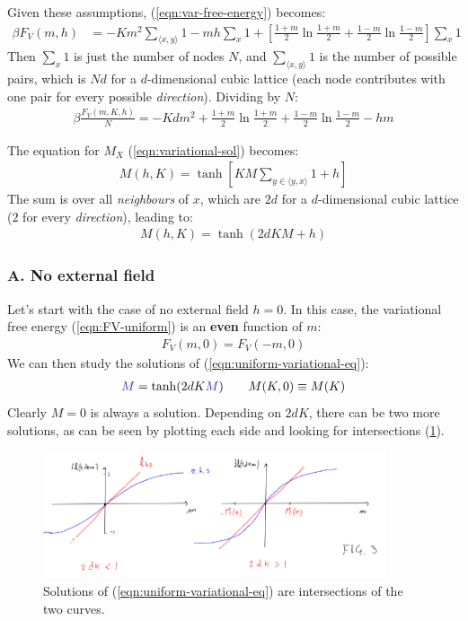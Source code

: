 \documentclass[../../main.tex]{subfiles}
\begin{document}
\medskip

Given these assumptions, (\ref{eqn:var-free-energy}) becomes:
\begin{align*}
    \beta F_V(m, h) &= -K m^2 \sum_{\langle x,y \rangle} 1 - mh\sum_x1 + \left[\frac{1+m}{2} \ln \frac{1+m}{2} + \frac{1-m}{2} \ln \frac{1-m}{2} \right] \sum_x 1 
\end{align*}
Then $\sum_x 1$ is just the number of nodes $N$, and $\sum_{\langle x,y \rangle} 1$ is the number of possible pairs, which is $N d$ for a $d$-dimensional cubic lattice (each node contributes with one pair for every possible \textit{direction}). Dividing by $N$:
\begin{align}\label{eqn:FV-uniform}
    \beta \frac{F_V(m,K,h)}{N} = - K d m^2 + \frac{1+m}{2} \ln \frac{1+m}{2} + \frac{1-m}{2} \ln \frac{1-m}{2} - hm   
\end{align}

The equation for $M_X$ (\ref{eqn:variational-sol}) becomes:
\begin{align*}
    M(h, K) = \tanh \left[KM \sum_{y \in \langle y, x\rangle} 1 + h\right]
\end{align*}
The sum is over all \textit{neighbours} of $x$, which are $2d$ for a $d$-dimensional cubic lattice ($2$ for every \textit{direction}), leading to:
\begin{align}
    \label{eqn:uniform-variational-eq}
    M(h,K) = \tanh(2dKM + h)
\end{align} 

\subsubsection{A. No external field}
Let's start with the case of no external field $h=0$. 
In this case, the variational free energy (\ref{eqn:FV-uniform}) is an \textbf{even}  function of $m$: 
\begin{align*}
    F_V(m,0) = F_V(-m,0)
\end{align*}
We can then study the solutions of (\ref{eqn:uniform-variational-eq}):
\begin{align}\label{eqn:h0case}
    \textcolor{Blue}{M} = \tanh(2dK\textcolor{Blue}{M}) \qquad M(K,0) \equiv M(K)
\end{align}
Clearly $M=0$ is always a solution. Depending on $2dK$, there can be two more solutions, as can be seen by plotting each side and looking for intersections (\ref{fig:uniformh0}).

\begin{figure}[H]
    \centering
    \includegraphics[width=0.9\textwidth]{uniformh0.png}
    \caption{Solutions of (\ref{eqn:uniform-variational-eq}) are intersections of the two curves.}
    \label{fig:uniformh0}
\end{figure}
\end{document}
